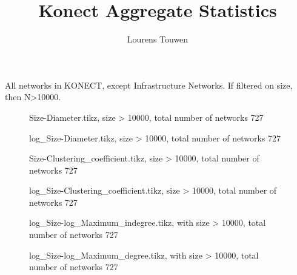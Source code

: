 \documentclass[fleqn]{article}
\title{Konect Aggregate Statistics}
\author{Lourens Touwen}
\begin{document}
	
	\pagestyle{plain}
	
	\maketitle
	
	\newlength\fheight 
	\newlength\fwidth 
	\setlength{} 
	\setlength{}
	
	
	All networks in KONECT, except Infrastructure Networks. If filtered on size, then N>10000.
	
	\begin{figure}[!htb]
		\centering
		
		\caption{Size-Diameter.tikz, size > 10000, total number of networks 727}
	\end{figure}

	\begin{figure}[!htb]
		\centering
		
		\caption{log\_Size-Diameter.tikz, size > 10000, total number of networks 727}
	\end{figure}

	\begin{figure}[!htb]
		\centering
		
		\caption{Size-Clustering\_coefficient.tikz, size > 10000, total number of networks 727}
	\end{figure}

	\begin{figure}[!htb]
		\centering
		
		\caption{log\_Size-Clustering\_coefficient.tikz, size > 10000, total number of networks 727}
	\end{figure}
	
	\begin{figure}[!htb]
		\centering
		
		\caption{log\_Size-log\_Maximum\_indegree.tikz, with size > 10000, total number of networks 727}
	\end{figure}	

	\begin{figure}[!htb]
		\centering
		
		\caption{log\_Size-log\_Maximum\_degree.tikz, with size > 10000, total number of networks 727}
	\end{figure}
	
\end{document}
